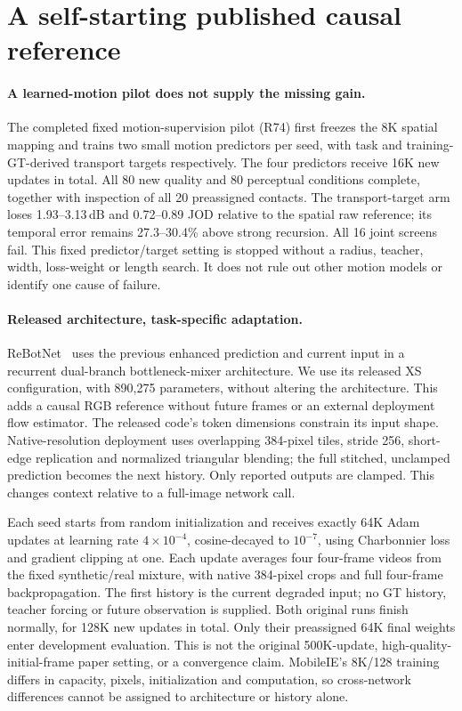 \section{A self-starting published causal reference}
\label{sec:causal-reference}
\paragraph{A learned-motion pilot does not supply the missing gain.}
The completed fixed motion-supervision pilot (R74) first freezes the
8K spatial mapping and trains two small motion predictors per seed,
with task and training-GT-derived transport targets respectively.
The four predictors receive 16K new updates in total. All 80 new
quality and 80 perceptual conditions complete, together with inspection
of all 20 preassigned contacts. The transport-target arm loses
1.93--3.13\,dB and 0.72--0.89 JOD relative to the spatial raw reference;
its temporal error remains 27.3--30.4\% above strong recursion.
All 16 joint screens fail. This fixed predictor/target setting is stopped
without a radius, teacher, width, loss-weight or length search. It does
not rule out other motion models or identify one cause of failure.

\paragraph{Released architecture, task-specific adaptation.}
ReBotNet~\cite{rebotnet} uses the previous enhanced prediction and
current input in a recurrent dual-branch bottleneck-mixer architecture.
We use its released XS configuration, with 890,275 parameters, without
altering the architecture. This adds a causal RGB reference without
future frames or an external deployment flow estimator. The released
code's token dimensions constrain its input shape. Native-resolution
deployment uses overlapping 384-pixel tiles, stride 256, short-edge
replication and normalized triangular blending; the full stitched,
unclamped prediction becomes the next history. Only reported outputs
are clamped. This changes context relative to a full-image network call.

Each seed starts from random initialization and receives exactly
64K Adam updates at learning rate $4\times10^{-4}$, cosine-decayed to
$10^{-7}$, using Charbonnier loss and gradient clipping at one.
Each update averages four four-frame videos from the fixed synthetic/real
mixture, with native 384-pixel crops and full four-frame backpropagation.
The first history is the current degraded input; no GT history,
teacher forcing or future observation is supplied. Both original runs
finish normally, for 128K new updates in total. Only their preassigned
64K final weights enter development evaluation. This is not the original
500K-update, high-quality-initial-frame paper setting, or a convergence
claim. MobileIE's 8K/128 training differs in capacity, pixels,
initialization and computation, so cross-network differences cannot
be assigned to architecture or history alone.

